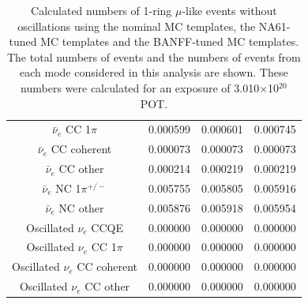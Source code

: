 \begin{table}
\begin{tabular}{| c | c | c | c | }
$\bar{\nu}_{e}$ CC 1$\pi$ &        0.000599 & 0.000601 & 0.000745 \\
$\bar{\nu}_{e}$ CC coherent &        0.000073 & 0.000073 & 0.000073 \\
$\bar{\nu}_{e}$ CC other &        0.000214 & 0.000219 & 0.000219 \\
$\bar{\nu}_{e}$ NC 1$\pi^{+/-}$ &        0.005755 & 0.005805 & 0.005916 \\
$\bar{\nu}_{e}$ NC other &        0.005876 & 0.005918 & 0.005954 \\
Oscillated $\nu_e$ CCQE &        0.000000 & 0.000000 & 0.000000 \\
Oscillated $\nu_e$ CC 1$\pi$ &        0.000000 & 0.000000 & 0.000000 \\
Oscillated $\nu_e$ CC coherent &        0.000000 & 0.000000 & 0.000000 \\
Oscillated $\nu_e$ CC other &        0.000000 & 0.000000 & 0.000000 \\
\hline
\end{tabular}
\caption{
  Calculated numbers of 1-ring $\mu$-like events without oscillations using the nominal MC templates, the 
  NA61-tuned MC templates and the BANFF-tuned MC templates.
  The total numbers of events and the numbers of events from each mode considered in this analysis are shown.
  These numbers were calculated for an exposure of 3.010$\times$10$^{20}$ POT.
}
\label{tab:nsk_nominal_x3_no_osc}
\end{table}


